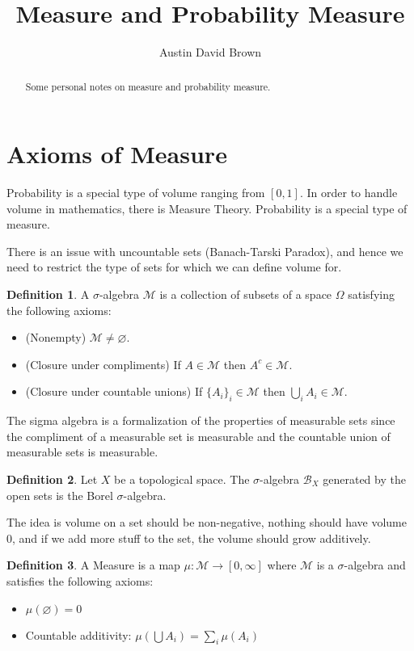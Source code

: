 \documentclass[12pt, reqno]{amsart}
\numberwithin{equation}{section}
\theoremstyle{definition}
\theoremstyle{definition}
\newtheorem*{definition*}{Definition}
\let\emptyset\varnothing
\begin{document}
\title{Measure and Probability Measure}
\author{Austin David Brown}
\maketitle

\begin{abstract}
Some personal notes on measure and probability measure. 
\end{abstract}

\section{Axioms of Measure}

Probability is a special type of volume ranging from $[0, 1]$. In order to handle volume in mathematics, there is Measure Theory. Probability is a special type of measure.

There is an issue with uncountable sets (Banach-Tarski Paradox), and hence we need to restrict the type of sets for which we can define volume for.

\begin{definition*}
A $\sigma$-algebra $\mathcal{M}$ is a collection of subsets of a space $\Omega$ satisfying the following axioms:
\begin{itemize}
\item (Nonempty) $\mathcal{M} \not= \emptyset$.
\item (Closure under compliments) If $A \in \mathcal{M}$ then $A^c \in \mathcal{M}$.
\item (Closure under countable unions) If $\{A_i\}_{i} \in \mathcal{M}$ then $\bigcup_{i} A_i \in \mathcal{M}$.
\end{itemize}
\end{definition*}

The sigma algebra is a formalization of the properties of measurable sets since
the compliment of a measurable set is measurable and the countable union of measurable sets is measurable.

\begin{definition*}
Let $X$ be a topological space. The $\sigma$-algebra $\mathcal{B}_X$ generated by the open sets is the Borel $\sigma$-algebra.
\end{definition*}

The idea is volume on a set should be non-negative, nothing should have volume $0$, and if we add more stuff to the set, the volume should grow additively. 

\begin{definition*}
A Measure is a map $\mu : \mathcal{M} \to [0, \infty]$ where $\mathcal{M}$ is a $\sigma$-algebra and satisfies the following axioms:
\begin{itemize}
\item $\mu(\emptyset) = 0$
\item Countable additivity: $\mu(\bigcup A_i) = \sum_{i} \mu(A_i)$
\end{itemize}
\end{definition*}
\end{document}
